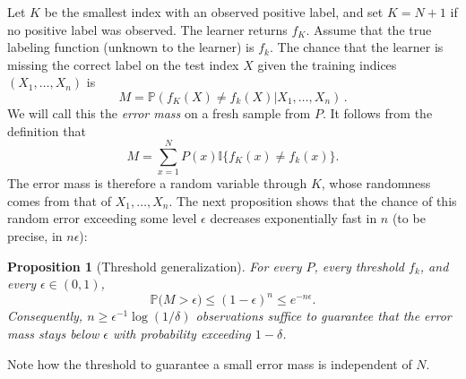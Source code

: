 \documentclass[11pt,twoside]{article}
\newcommand{\I}{\mathbb I}
\renewcommand{\P}{\mathbb P}
\newtheorem{proposition}[theorem]{Proposition}
\theoremstyle{definition}
\theoremstyle{remark}
\begin{document}
\newcommand{\kest}{K}
Let $\kest$ be the smallest index with an
observed positive label, and set $\kest=N+1$ if no positive label was
observed. The learner returns $f_{\kest}$.
Assume that the true labeling function (unknown to the learner) is $f_k$.
The chance that the learner is missing the correct label on the test index $X$
given the training indices $(X_1,\dots,X_n)$ is
\begin{equation}
M=\P(f_\kest(X)\ne f_k(X)| X_1,\dots,X_n)\,.
\label{eq:threshold-risk}
\end{equation}
We will call this the \emph{error mass} on a fresh sample from $P$.
It follows from the definition that
\[
M = \sum_{x=1}^N P(x)\I\{f_{\kest}(x)\ne f_k(x)\}.
\]
The error mass is therefore a random variable
through $\kest$, whose randomness comes from that of $X_1,\dots,X_n$.
The next proposition shows that the chance of this random
error exceeding some level $\epsilon$ decreases exponentially fast in $n$
(to be precise, in $n\epsilon$):

\begin{proposition}[Threshold generalization]
\label{prop:threshold}
For every $P$, every threshold $f_k$, and every $\epsilon\in(0,1)$,
\begin{equation}
\P\bigl(M>\epsilon\bigr)
\le (1-\epsilon)^n
\le e^{-n\epsilon}.
\label{eq:threshold-bound}
\end{equation}
Consequently, $n\ge \epsilon^{-1}\log(1/\delta)$
observations suffice to guarantee that the error mass stays below $\epsilon$
with probability exceeding $1-\delta$.
\end{proposition}
Note how the threshold to guarantee a small error mass is independent of $N$.
\end{document}
